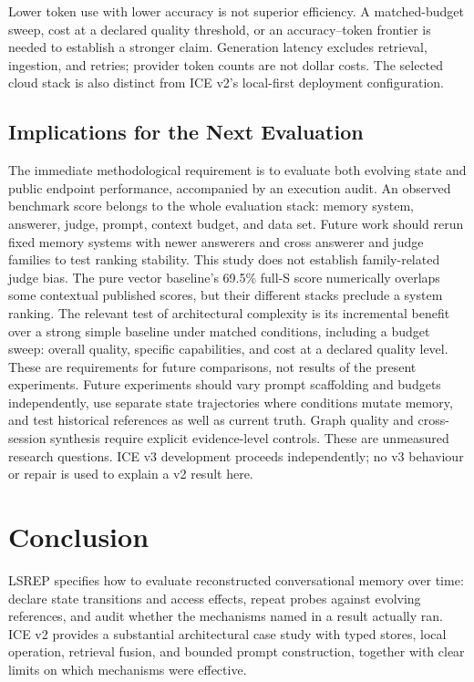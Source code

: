 \documentclass[twoside,11pt]{article}
\begin{document}
Lower token use with lower accuracy is not superior efficiency. A matched-budget sweep, cost at a declared quality threshold, or an accuracy--token frontier is needed to establish a stronger claim. Generation latency excludes retrieval, ingestion, and retries; provider token counts are not dollar costs. The selected cloud stack is also distinct from ICE v2's local-first deployment configuration.

\subsection{Implications for the Next Evaluation}
\label{sec:future-work}
The immediate methodological requirement is to evaluate both evolving state and public endpoint performance, accompanied by an execution audit.
An observed benchmark score belongs to the whole evaluation stack: memory system, answerer, judge, prompt, context budget, and data set. Future work should rerun fixed memory systems with newer answerers and cross answerer and judge families to test ranking stability. This study does not establish family-related judge bias. The pure vector baseline's 69.5\% full-S score numerically overlaps some contextual published scores, but their different stacks preclude a system ranking. The relevant test of architectural complexity is its incremental benefit over a strong simple baseline under matched conditions, including a budget sweep: overall quality, specific capabilities, and cost at a declared quality level. These are requirements for future comparisons, not results of the present experiments.
 Future experiments should vary prompt scaffolding and budgets independently, use separate state trajectories where conditions mutate memory, and test historical references as well as current truth. Graph quality and cross-session synthesis require explicit evidence-level controls. These are unmeasured research questions. ICE v3 development proceeds independently; no v3 behaviour or repair is used to explain a v2 result here.

\section{Conclusion}
\label{sec:conclusion}
LSREP specifies how to evaluate reconstructed conversational memory over time: declare state transitions and access effects, repeat probes against evolving references, and audit whether the mechanisms named in a result actually ran. ICE v2 provides a substantial architectural case study with typed stores, local operation, retrieval fusion, and bounded prompt construction, together with clear limits on which mechanisms were effective.
\end{document}

